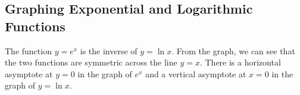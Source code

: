     \subsection{Graphing Exponential and Logarithmic Functions}
        The function $y=e^x$ is the inverse of $y=\ln{x}$. From the graph, we can see that the
        two functions are symmetric across the line $y=x$. There is a horizontal asymptote at
        $y=0$ in the graph of $e^x$ and a vertical asymptote at $x=0$ in the graph of $y=\ln{x}$.

        \begin{center}
        \end{center}